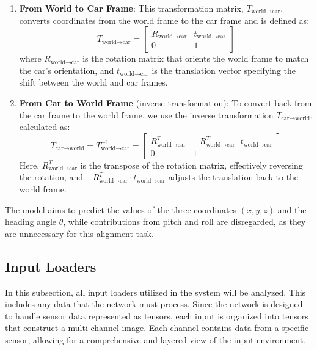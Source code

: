 \begin{enumerate}
    \item \textbf{From World to Car Frame}: This transformation matrix, \( T_{\text{world} \to \text{car}} \), converts coordinates from the world frame to the car frame and is defined as:
    \begin{equation}
        T_{\text{world} \to \text{car}} = \begin{bmatrix} R_{\text{world} \to \text{car}} & t_{\text{world} \to \text{car}} \\ 0 & 1 \end{bmatrix}
    \end{equation}
    where \( R_{\text{world} \to \text{car}} \) is the rotation matrix that orients the world frame to match the car's orientation, and \( t_{\text{world} \to \text{car}} \) is the translation vector specifying the shift between the world and car frames.

    \item \textbf{From Car to World Frame} (inverse transformation): To convert back from the car frame to the world frame, we use the inverse transformation \( T_{\text{car} \to \text{world}} \), calculated as:
    \begin{equation}
        T_{\text{car} \to \text{world}} = T_{\text{world} \to \text{car}}^{-1} = \begin{bmatrix} R_{\text{world} \to \text{car}}^T & -R_{\text{world} \to \text{car}}^T \cdot t_{\text{world} \to \text{car}} \\ 0 & 1 \end{bmatrix}
    \end{equation}
    Here, \( R_{\text{world} \to \text{car}}^T \) is the transpose of the rotation matrix, effectively reversing the rotation, and \( -R_{\text{world} \to \text{car}}^T \cdot t_{\text{world} \to \text{car}} \) adjusts the translation back to the world frame.
    
\end{enumerate}

The model aims to predict the values of the three coordinates \( (x, y, z) \) and the heading angle \( \theta \), while contributions from pitch and roll are disregarded, as they are unnecessary for this alignment task.

\subsection{Input Loaders}
In this subsection, all input loaders utilized in the system will be analyzed. This includes any data that the network must process. Since the network is designed to handle sensor data represented as tensors, each input is organized into tensors that construct a multi-channel image. Each channel contains data from a specific sensor, allowing for a comprehensive and layered view of the input environment.

